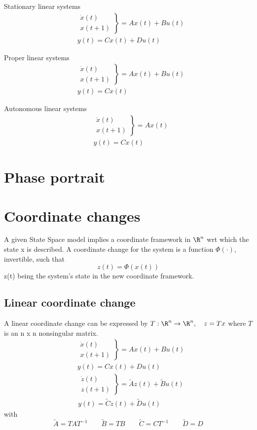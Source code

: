 \documentclass[english]{lectures}
\begin{document}
Stationary linear systems
\begin{align*} 
&\left. \begin{array}{r} 
\dot{x}(t)\\[1ex]
{}x(t+1)
\end{array} \right\} 
=Ax(t)+Bu(t)\\
&y(t)=Cx(t) + Du(t)
\end{align*}

Proper linear systems
\begin{align*} 
&\left. \begin{array}{r} 
\dot{x}(t)\\[1ex]
{}x(t+1)
\end{array} \right\} 
=Ax(t)+Bu(t)\\
&y(t)=Cx(t)
\end{align*}

Autonomous linear systems
\begin{align*} 
&\left. \begin{array}{r} 
\dot{x}(t)\\[1ex]
{}x(t+1)
\end{array} \right\} 
=Ax(t)\\
&y(t)=Cx(t)
\end{align*}

\section{Phase portrait}

\section{Coordinate changes}
A given State Space model implies a coordinate framework in $\R^n$ wrt which the state x is described. A coordinate change for the system is a function $\Phi(\cdot)$, invertible, such that 
\[
z(t)=\Phi(x(t))
\]
z(t) being the system's state in the new coordinate framework.
\subsection{Linear coordinate change}
A linear coordinate change can be expressed by $T:\R^n \to \R^n, \quad z=Tx$ where $T$ is an n x n nonsingular matrix.
\begin{align*} 
&\left. \begin{array}{r} 
\dot{x}(t)\\[1ex]
{}x(t+1)
\end{array} \right\} 
=Ax(t)+Bu(t)\\
&y(t)=Cx(t)+Du(t)
\end{align*}
\begin{align*} 
&\left. \begin{array}{r} 
\dot{z}(t)\\[1ex]
{}z(t+1)
\end{array} \right\} 
=\tilde{A}z(t)+\tilde{B}u(t)\\
&y(t)=\tilde{C}z(t)+\tilde{D}u(t)
\end{align*}
with
\[
\tilde{A}=TAT^{-1} \qquad \tilde{B}=TB \qquad \tilde{C}=CT^{-1} \qquad \tilde{D}=D
\]
\end{document}
